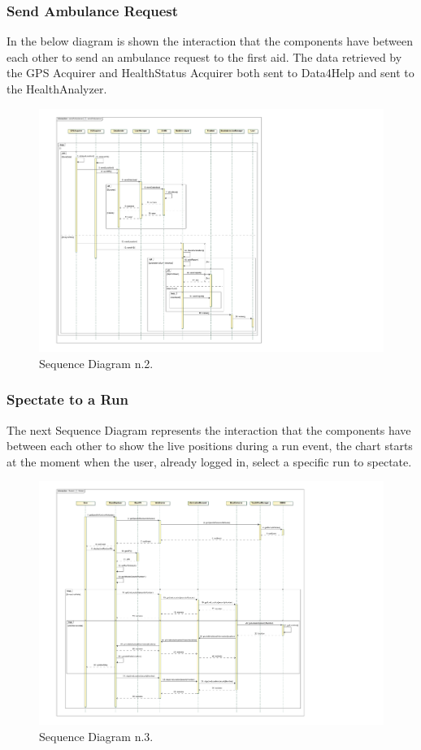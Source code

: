 \subsubsection{Send Ambulance Request}
In the below diagram is shown the interaction that the components have between each other to send an ambulance request to the first aid. The data retrieved by the GPS Acquirer and HealthStatus Acquirer both sent to Data4Help and sent to the HealthAnalyzer.
\\[0.5cm]
\begin{figure}[H]
\centering
\includegraphics[scale=0.93, angle=0,origin=c]{Images/SequenceDiagrams/SendAmbulance.pdf}
\caption{Sequence Diagram n.2.}
\clearpage
\end{figure}
\newpage
\subsubsection{Spectate to a Run}
The next Sequence Diagram represents the interaction that the components have between each other to show the live positions during a run event, the chart starts at the moment when the user, already logged in, select a specific run to spectate.
\\[1.0cm]
\begin{figure}[H]
\centering
\includegraphics[scale=0.8, angle=0,origin=c]{Images/SequenceDiagrams/SpectateRun.pdf}
\caption{Sequence Diagram n.3.}
\end{figure}
\clearpage


